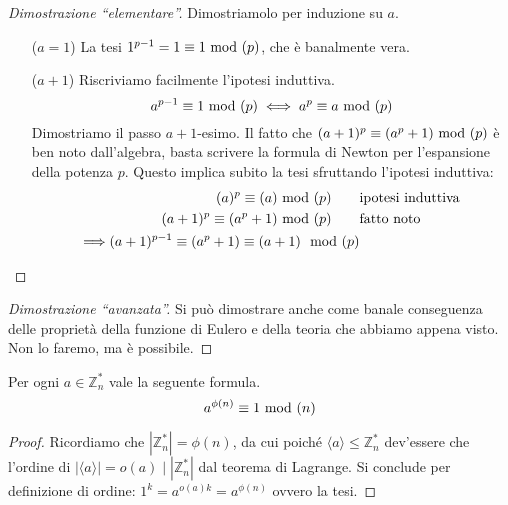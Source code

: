 \begin{proof}[Dimostrazione \enquote{elementare}]
	Dimostriamolo per induzione su $a$.
	\begin{enumerate}
		\item[($a=1$)]La tesi  $1^{p-1}=1\equiv1\ \mathrm{mod}\ (p)$, che è banalmente vera. 
		\item[($a+1$)] Riscriviamo facilmente l'ipotesi induttiva.
		\begin{equation*}
		a^{p-1}\equiv1\ \mathrm{mod}\ (p)\iff a^p\equiv a\ \mathrm{mod}\ (p)
		\end{equation*}
		Dimostriamo il passo $a+1$-esimo. Il fatto che $(a+1)^p\equiv(a^p+1)\ \mathrm{mod}\ (p)$ è ben noto dall'algebra, basta scrivere la formula di Newton per l'espansione della potenza $p$. Questo implica subito la tesi sfruttando l'ipotesi induttiva:
		\begin{align*}
		(a)^{p}\equiv(a)\ \mathrm{mod}\ (p) \ \ \ \ \ \ &\text{ipotesi induttiva}\\
		(a+1)^p\equiv(a^p+1)\ \mathrm{mod}\ (p) \ \ \ \ \ \ &\text{fatto noto}\\
		\Longrightarrow (a+1)^{p-1}\equiv (a^p+1) \equiv (a+1)\mod(p)
		\end{align*}
	\end{enumerate}
\end{proof}
\begin{proof}[Dimostrazione \enquote{avanzata}] 
	Si può dimostrare anche come banale conseguenza delle proprietà della funzione di Eulero e della teoria che abbiamo appena visto. \\ Non lo faremo, ma è possibile. 
\end{proof}
\begin{teorema}
	Per ogni $a\in\mathbb{Z}_n^*$ vale la seguente formula.
	\begin{equation*}
	a^{\phi(n)}\equiv 1 \ \mathrm{mod}\ (n)
	\end{equation*}
\end{teorema}
\begin{proof}
	Ricordiamo che $|\mathbb{Z}^*_n| = \phi(n)$, da cui poiché $\langle a\rangle \le \mathbb{Z}^*_n$ dev'essere che l'ordine di $|\langle a\rangle| = o(a) \mid |\mathbb{Z}^*_n|$ dal teorema di Lagrange. Si conclude per definizione di ordine: $1^k = a^{o(a)k} = a^{\phi(n)}$ ovvero la tesi. 
\end{proof}




